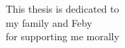 \begin{dedication}
This thesis is dedicated to\\
 my family and Feby\\
for supporting me morally \\

\end{dedication}